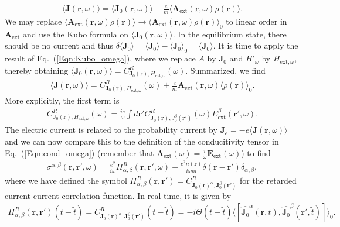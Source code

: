 \documentclass[english]{scrartcl}
\newcommand{\eq}[1]{Eq.~(\ref{#1})}
\begin{document}
\begin{align*}
\langle \bm J(\bm r, \omega) \rangle = \langle \bm J_0(\bm r, \omega) \rangle + \frac{e}{m}  \langle \bm A_\text{ext}(\bm r, \omega) \rho (\bm r) \rangle.
\end{align*}
We may replace $ \langle \bm A_\text{ext}(\bm r, \omega) \rho (\bm r) \rangle \to  \langle \bm A_\text{ext}(\bm r, \omega) \rho (\bm r) \rangle_0$ to linear order in $\bm A_\text{ext}$ and use the Kubo formula on $\langle \bm J_0(\bm r, \omega) \rangle$. In the equilibrium state, there should be no current and thus $\delta \langle \bm J_0 \rangle = \langle \bm J_0 \rangle - \langle \bm J_0 \rangle_0 = \langle \bm J_0 \rangle$. It is time to apply the result of \eq{Eqn:Kubo_omega}, where we replace $A$ by $\bm J_0$ and $H'_\omega$ by $H_{\text{ext}, \omega}$, thereby obtaining $ \langle \bm J_0 (\bm r, \omega)  \rangle = C_{\bm J_0 (\bm r), H_{\text{ext}, \omega}}^R (\omega) $. Summarized, we find
\begin{align*}
\langle \bm J(\bm r, \omega) \rangle =C_{\bm J_0 (\bm r), H_{\text{ext}, \omega}}^R (\omega) + \frac{e}{m}   \bm A_\text{ext}(\bm r, \omega) \langle \rho (\bm r) \rangle_0.
\end{align*}
More explicitly, the first term is 
\begin{align*}
C_{\bm J_0 (\bm r), H_{\text{ext}, \omega}}^R (\omega) = \frac{i e}{\omega} \int d \bm r' C_{\bm J_0 (\bm r),  J_0^\beta (\bm r')}^R (\omega)   E^\beta_\text{ext}(\bm r', \omega).
\end{align*}
The electric current is related to the probability current by $\bm J_e = -e \langle \bm J(\bm r, \omega) \rangle$ and we can now compare this to the definition of the conducitivity tensor in \eq{Eqn:cond_omega} (remember that $\bm A_\text{ext}(\omega) = \frac{i}{\omega} \bm E_\text{ext}(\omega)$) to find
\begin{align}
\sigma^{\alpha, \beta}(\bm r , \bm r', \omega) = \frac{e^2}{i \omega} \Pi_{\alpha, \beta}^R (\bm r , \bm r', \omega) + \frac{e^2 n(\bm r)}{i \omega m} \delta(\bm r - \bm r') \delta_{\alpha, \beta}, \label{Eqn:cond_omega_Kubo}
\end{align}
where we have defined the symbol $\Pi_{\alpha, \beta}^R  (\bm r , \bm r')  = C_{\bm J_0 (\bm r)^\alpha, \bm J_0^\beta (\bm r')}^R$ for the retarded current-current correlation function. In real time, it is given by
\begin{align*}
\Pi_{\alpha, \beta}^R  (\bm r , \bm r')(t - \tilde t) = C_{\bm J_0 (\bm r)^\alpha, \bm J_0^\beta (\bm r')}^R(t- \tilde t) = -i \Theta (t - \tilde t) \langle \left[\hat {\bm J_0}^\alpha (\bm r, t), \hat  {\bm J_0}^\beta (\bm r', \tilde t) \right ] \rangle_0.
\end{align*}
\end{document}
